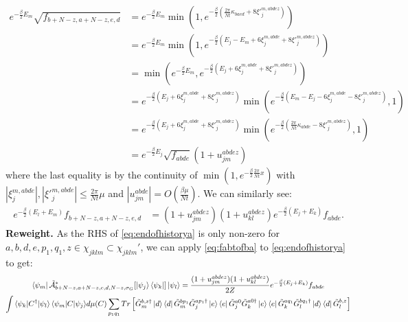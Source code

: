 \documentclass[aps,floatfix,10pt,amssymb,amsfont,amsmath,superscriptaddress,float,nofootinbib,longbibliography,nobalancelastpage,twocolumn]{revtex4-2}
\begin{document}
\begin{equation}
    \begin{aligned}
    e^{-\frac{\beta}{2}E_m}\sqrt{f_{b+N-z,a+N-z,e,d}} &= e^{-\frac{\beta}{2}E_m}\min(1,e^{-\frac{\beta}{2}(\frac{2\pi}{Nt}\kappa_{baed}+ 8\xi'^{m,abdez}_j)})\\
    &= e^{-\frac{\beta}{2}E_m}\min(1,e^{-\frac{\beta}{2}(E_j-E_m + 6\xi^{m,abde}_j+ 8\xi'^{m,abdez}_j)})\\
    &= \min\!\left(e^{-\frac{\beta}{2}E_m}, e^{-\frac{\beta}{2}(E_j + 6\xi^{m,abde}_j+ 8\xi'^{m,abdez}_j)}\right)\\
    &= e^{-\frac{\beta}{2}(E_j+ 6\xi^{m,abde}_j+ 8\xi'^{m,abdez}_j)} \min(e^{-\frac{\beta}{2}(E_m-E_j-6\xi^{m,abde}_j- 8\xi'^{m,abdez}_j)},1)\\
     &= e^{-\frac{\beta}{2}(E_j+ 6\xi^{m,abde}_j+ 8\xi'^{m,abdez}_j)} \min(e^{-\frac{\beta}{2}(\frac{2\pi}{Nt}\kappa_{abde}- 8\xi'^{m,abdez}_j)},1)\\
    &= e^{-\frac{\beta}{2}E_j}\sqrt{f_{abde}}(1+u^{abdez}_{jm})
\end{aligned}
\end{equation}
where the last equality is by the continuity of $\min(1,e^{-\frac{\beta}{2}\frac{2\pi}{Nt}x})$ with $|\xi^{m,abde}_j|,|\xi'^{m,abde}_j| \leq \frac{2\pi}{Nt}\mu$
and $|u^{abde}_{jm}| = O(\frac{\beta \mu}{Nt})$. We can similarly see:
\begin{equation}
\begin{aligned}
e^{-\frac{\beta}{2}(E_l+E_m)}f_{b+N-z,a+N-z,e,d}
&=(1+u_{jm}^{abdez})(1+u_{kl}^{abdez})e^{-\frac{\beta}{2}(E_j+E_k)}f_{abde}.
\end{aligned}
\label{eq:fabtofba}
\end{equation}
\textbf{Reweight.} As the RHS of \eqref{eq:endofhistorya} is only non-zero for $a,b,d,e,p_1,q_1,z \in \chi_{jklm} \subset \chi_{jklm}'$, we can apply \eqref{eq:fabtofba} to \eqref{eq:endofhistorya} to get:
\begin{multline}
\bra{\psi_m}\tilde{\mathcal{A}}^*_{b+N-z,a+N-z,e,d,N-z,\sigma_G}[\ket{\psi_j}\bra{\psi_k}]\ket{\psi_l} 
   = \frac{(1+u_{jm}^{abdez})(1+u_{kl}^{abdez})}{2Z}   e^{-\frac{\beta}{2}(E_j+E_k)}{f_{abde}}  \\\int {\braket{\psi_k|C^{\dagger}|\psi_l}\braket{\psi_m|C|\psi_j}} d\mu(C)\sum_{p_1q_1}Tr\left[ {\tilde G_m^{b, z\dagger}\ket{d}\bra{d}\tilde G_m^{bp_1}} {\tilde G^{ap_1\dagger}_j\ket{e}\bra{e}\tilde G^{a0}_j } \tilde G^{a0\dagger}_k\ket{e}\bra{e}\tilde G^{aq_1}_k \tilde G_l^{bq_1\dagger}\ket{d}\bra{d}\tilde G_l^{b,z}\right]
\end{multline}
\end{document}
